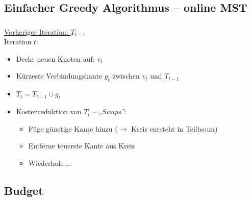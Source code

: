 
\subsection{Einfacher Greedy Algorithmus -- online MST}

\begin{frame}
    \frametitle{\insertsubsection}
    \underline{Vorheriger Iteration: \qquad $T_{t-1}$}\\
    \vspace{1em}
    Iteration $t$:
    \begin{itemize}
        \itemsep\setlength{.8em}
        \item Decke neuen Knoten auf: $v_t$
        \item Kürzeste Verbindungskante $g_t$ zwischen $v_t$ und $T_{t-1}$
        \item $T_t = T_{t-1} \cup g_t$
        \vspace{1em}
        \item Kostenreduktion von $T_t$ -- \textit{„Swaps”}:
        \vspace{.8em}
        \begin{itemize}
        \itemsep\setlength{.8em}
            \item Füge günstige Kante hinzu ($\rightarrow$ Kreis entsteht in Teilbaum)
            \item Entferne teuerste Kante aus Kreis
            \item Wiederhole ...
        \end{itemize}
    \end{itemize}
\end{frame}

\subsection{Budget}

